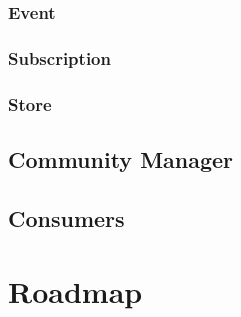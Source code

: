 \documentclass[letterpaper,11pt]{article}
\begin{document}
\subsubsection{Event}

\subsubsection{Subscription}

\subsubsection{Store}

\subsection{Community Manager}

\subsection{Consumers}

\section{Roadmap}



\end{document}
